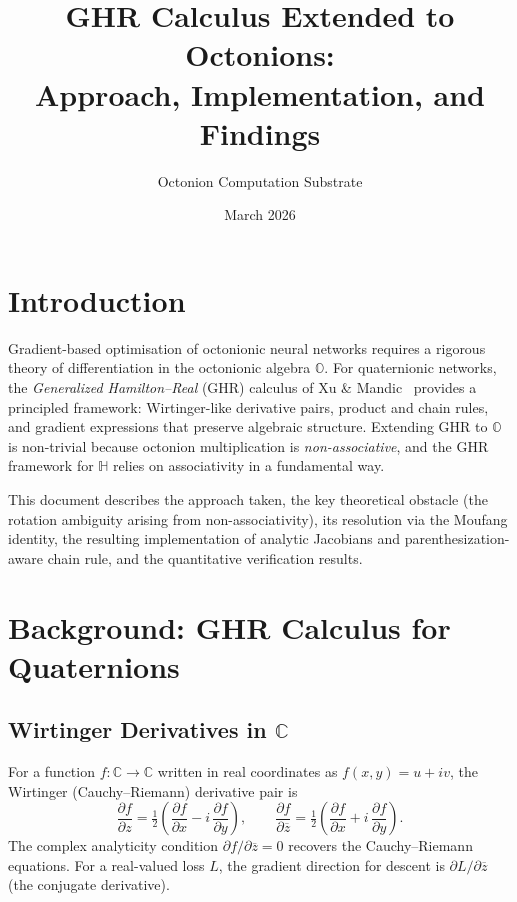 \documentclass[11pt]{article}
\title{GHR Calculus Extended to Octonions:\\
Approach, Implementation, and Findings}
\author{Octonion Computation Substrate}
\date{March 2026}
\newcommand{\OO}{\mathbb{O}}
\newcommand{\HH}{\mathbb{H}}
\newcommand{\CC}{\mathbb{C}}
\newcommand{\conj}[1]{\overline{#1}}
\newcommand{\pd}[2]{\frac{\partial #1}{\partial #2}}
\begin{document}
\maketitle
\tableofcontents

\bigskip

\section{Introduction}

Gradient-based optimisation of octonionic neural networks requires a rigorous
theory of differentiation in the octonionic algebra $\OO$.  For quaternionic
networks, the \emph{Generalized Hamilton--Real} (GHR) calculus of Xu \&
Mandic~\cite{xu2015ghr} provides a principled framework: Wirtinger-like
derivative pairs, product and chain rules, and gradient expressions that
preserve algebraic structure.  Extending GHR to $\OO$ is non-trivial because
octonion multiplication is \emph{non-associative}, and the GHR framework for
$\HH$ relies on associativity in a fundamental way.

This document describes the approach taken, the key theoretical obstacle
(the rotation ambiguity arising from non-associativity), its resolution via
the Moufang identity, the resulting implementation of analytic Jacobians and
parenthesization-aware chain rule, and the quantitative verification results.

\section{Background: GHR Calculus for Quaternions}

\subsection{Wirtinger Derivatives in \texorpdfstring{$\CC$}{C}}

For a function $f:\CC\to\CC$ written in real coordinates as
$f(x,y)=u+iv$, the Wirtinger (Cauchy--Riemann) derivative pair is
\begin{equation}
  \pd{f}{z} = \tfrac{1}{2}\!\left(\pd{f}{x} - i\,\pd{f}{y}\right),
  \qquad
  \pd{f}{\conj{z}} = \tfrac{1}{2}\!\left(\pd{f}{x} + i\,\pd{f}{y}\right).
\end{equation}
The complex analyticity condition $\partial f/\partial\conj{z}=0$ recovers the
Cauchy--Riemann equations.  For a real-valued loss $L$, the gradient direction
for descent is $\partial L/\partial\conj{z}$ (the conjugate derivative).
\end{document}

